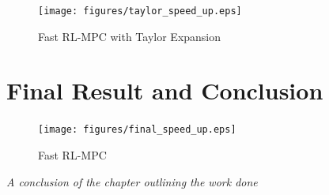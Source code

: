 \begin{figure}[H]
	\centering
	\texttt{[image: figures/taylor\_speed\_up.eps]}
	\caption{Fast RL-MPC with Taylor Expansion}
	\label{fig:taylor-speedup}
\end{figure}


\section{Final Result and Conclusion}

\begin{figure}[H]
	\centering
	\texttt{[image: figures/final\_speed\_up.eps]}
	\caption{Fast RL-MPC}
	\label{fig:final-speedup}
\end{figure}

\emph{A conclusion of the chapter outlining the work done}